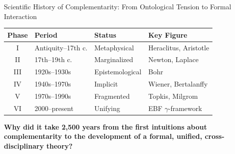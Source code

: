 \begin{chapter}{Scientific History of Complementarity: From Ontological Tension to Formal Interaction}
\begin{abstract}
This appendix provides a rigorous scientific history of complementarity---tracing its evolution from pre-scientific ontological intuitions through classical marginalization, quantum-mechanical epistemology, systems-theoretic implicitness, disciplinary fragmentation, to contemporary formal unification. We identify five critical phases: (I) ontological foundations, (II) reductionist suppression, (III) Bohrian epistemological articulation, (IV) systems-theoretic latency, and (V) formal island emergence. The analysis reveals why complementarity remained scientifically underdeveloped despite intuitive plausibility, and why the current moment---characterized by computational power, network theory, and cross-disciplinary data---enables the first unified theory of complementarity ($\gamma$). This historical reconstruction positions the EBF framework as the culmination of a 2,500-year intellectual trajectory.
\end{abstract}

\begin{tcolorbox}[colback=yellow!5!white,colframe=yellow!75!black,title=\textbf{Quick Reference: Historical Phases}]
\small
\renewcommand{\arraystretch}{1.2}
\begin{tabular}{@{}clll@{}}
\toprule
\textbf{Phase} & \textbf{Period} & \textbf{Status} & \textbf{Key Figure} \\
\midrule
I & Antiquity--17th c. & Metaphysical & Heraclitus, Aristotle \\
II & 17th--19th c. & Marginalized & Newton, Laplace \\
III & 1920s--1930s & Epistemological & Bohr \\
IV & 1940s--1970s & Implicit & Wiener, Bertalanffy \\
V & 1970s--1990s & Fragmented & Topkis, Milgrom \\
VI & 2000--present & Unifying & EBF $\gamma$-framework \\
\bottomrule
\end{tabular}
\end{tcolorbox}

\begin{tcolorbox}[colback=red!5!white,colframe=red!75!black,title=\textbf{Fundamental Question}]
\textbf{Why did it take 2,500 years from the first intuitions about complementarity to the development of a formal, unified, cross-disciplinary theory?}


\end{tcolorbox}
\end{chapter}
